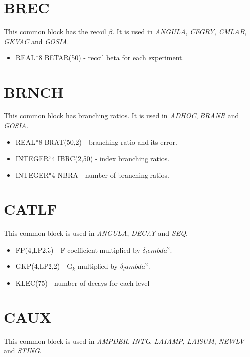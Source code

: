 \section{BREC}

This common block has the recoil $\beta$. It is used in \emph{ANGULA}, \emph{
CEGRY}, \emph{CMLAB}, \emph{GKVAC} and \emph{GOSIA}.

\begin{itemize}
\item REAL*8 BETAR(50) - recoil beta for each experiment.
\end{itemize}

\section{BRNCH}

This common block has branching ratios. It is used in \emph{ADHOC}, \emph{
BRANR} and \emph{GOSIA}.

\begin{itemize}
\item REAL*8 BRAT(50,2) - branching ratio and its error.
\item INTEGER*4 IBRC(2,50) - index branching ratios.
\item INTEGER*4 NBRA - number of branching ratios.
\end{itemize}

\section{CATLF}

This common block is used in \emph{ANGULA}, \emph{DECAY} and \emph{SEQ}.

\begin{itemize}
\item FP(4,LP2,3) - F coefficient multiplied by $\delta_lambda^2$.
\item GKP(4,LP2,2) - G$_k$ multiplied by $\delta_lambda^2$.
\item KLEC(75) - number of decays for each level
\end{itemize}

\section{CAUX}

This common block is used in \emph{AMPDER}, \emph{INTG}, \emph{LAIAMP}, \emph{
LAISUM}, \emph{NEWLV} and \emph{STING}.

